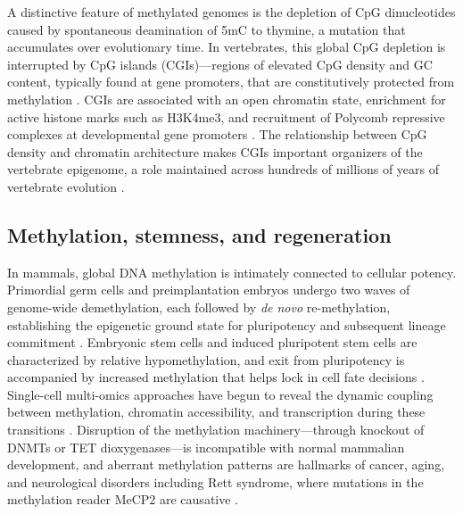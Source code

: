 \documentclass[12pt]{article}
\begin{document}
A distinctive feature of methylated genomes is the depletion of CpG dinucleotides caused by spontaneous deamination of 5mC to thymine, a mutation that accumulates over evolutionary time. In vertebrates, this global CpG depletion is interrupted by CpG islands (CGIs)---regions of elevated CpG density and GC content, typically found at gene promoters, that are constitutively protected from methylation \cite{gardiner-gardenCpGIslandsVertebrate1987, angeloniSequenceDeterminantsFunction2021}. CGIs are associated with an open chromatin state, enrichment for active histone marks such as H3K4me3, and recruitment of Polycomb repressive complexes at developmental gene promoters \cite{papinCpGIslandsShape2021, shaoStabilizationChromatinStructure1999}. The relationship between CpG density and chromatin architecture makes CGIs important organizers of the vertebrate epigenome, a role maintained across hundreds of millions of years of vertebrate evolution \cite{angeloniSequenceDeterminantsFunction2021}.


\subsection*{Methylation, stemness, and regeneration}

In mammals, global DNA methylation is intimately connected to cellular potency. Primordial germ cells and preimplantation embryos undergo two waves of genome-wide demethylation, each followed by \textit{de novo} re-methylation, establishing the epigenetic ground state for pluripotency and subsequent lineage commitment \cite{leeReprogrammingMethylomeErasing2014}. Embryonic stem cells and induced pluripotent stem cells are characterized by relative hypomethylation, and exit from pluripotency is accompanied by increased methylation that helps lock in cell fate decisions \cite{leeReprogrammingMethylomeErasing2014}. Single-cell multi-omics approaches have begun to reveal the dynamic coupling between methylation, chromatin accessibility, and transcription during these transitions \cite{clarkScNMTseqEnablesJoint2018}. Disruption of the methylation machinery---through knockout of DNMTs or TET dioxygenases---is incompatible with normal mammalian development, and aberrant methylation patterns are hallmarks of cancer, aging, and neurological disorders including Rett syndrome, where mutations in the methylation reader MeCP2 are causative \cite{demendozaEmergenceBrainNonCpG2021}.
\end{document}

